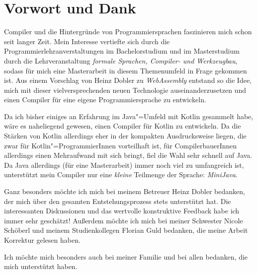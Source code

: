 \chapter{Vorwort und Dank}
 
Compiler und die Hintergründe von Programmiersprachen faszinieren mich schon seit langer Zeit. Mein Interesse vertiefte sich durch die Programmierlehranverstaltungen im Bachelorstudium und im Masterstudium durch die Lehrveranstaltung \emph{formale Sprachen, Compiler- und Werkzeugbau}, sodass für mich eine Masterarbeit in diesem Themenumfeld in Frage gekommen ist. Aus einem Vorschlag von Heinz Dobler zu \emph{WebAssembly} entstand so die Idee, mich mit dieser vielversprechenden neuen Technologie auseinanderzusetzen und einen Compiler für eine eigene Programmiersprache zu entwickeln.

Da ich bisher einiges an Erfahrung im Java"=Umfeld mit Kotlin gesammelt habe, wäre es naheliegend gewesen, einen Compiler für Kotlin zu entwickeln. Da die Stärken von Kotlin allerdings eher in der kompakten Ausdrucksweise liegen, die zwar für Kotlin"=ProgrammierInnen vorteilhaft ist, für CompilerbauerInnen allerdings einen Mehraufwand mit sich bringt, fiel die Wahl sehr schnell auf Java. Da Java allerdings (für eine Masterarbeit) immer noch viel zu umfangreich ist, unterstützt mein Compiler nur eine \emph{kleine} Teilmenge der Sprache: \emph{MiniJava}.

Ganz besonders möchte ich mich bei meinem Betreuer Heinz Dobler bedanken, der mich über den gesamten Entstehungsprozess stets unterstützt hat. Die interessanten Diskussionen und das wertvolle konstruktive Feedback habe ich immer sehr geschätzt! Außerdem möchte ich mich bei meiner Schwester Nicole Schöberl und meinem Studienkollegen Florian Guld bedanken, die meine Arbeit Korrektur gelesen haben.

Ich möchte mich besonders auch bei meiner Familie und bei allen bedanken, die mich unterstützt haben.
